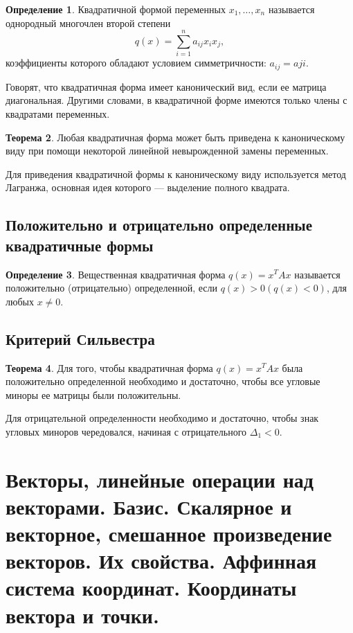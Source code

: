 \documentclass[12pt]{report}
\theoremstyle{definition}
\newtheorem{theorem}{Теорема}[chapter]
\newtheorem{definition}[theorem]{Определение}
\begin{document}
\begin{definition}
Квадратичной формой переменных $x_1, \dots, x_n$ называется однородный
многочлен второй степени
$$
q(x) = \sum\limits_{i=1}^n a_{ij} x_i x_j,
$$
коэффициенты которого обладают условием симметричности: $a_{ij} = a{ji}$.
\end{definition}

Говорят, что квадратичная форма имеет канонический вид, если ее матрица диагональная.
Другими словами, в квадратичной форме имеются только члены с квадратами переменных.

\begin{theorem}
Любая квадратичная форма может быть приведена к каноническому виду
при помощи некоторой линейной невырожденной замены переменных.
\end{theorem}

Для приведения квадратичной формы к каноническому виду используется
метод Лагранжа, основная идея которого --- выделение полного квадрата.

\subsection{Положительно и отрицательно определенные квадратичные формы}
\begin{definition}
Вещественная квадратичная форма $q(x) = x^T A x$ называется положительно (отрицательно)
определенной, если $q(x) > 0 (q(x) < 0)$, для любых $x \ne 0$.
\end{definition}

\subsection{Критерий Сильвестра}
\begin{theorem}
Для того, чтобы квадратичная форма $q(x) = x^T A x$ была положительно
определенной необходимо и достаточно, чтобы все угловые миноры ее матрицы
были положительны.
\end{theorem}

Для отрицательной определенности необходимо и достаточно, чтобы 
знак угловых миноров чередовался, начиная с отрицательного $\Delta_1 < 0$.


\section
{
  Векторы, линейные операции над векторами.
  Базис. Скалярное и векторное, смешанное произведение векторов.
  Их свойства. Аффинная система координат. Координаты вектора и точки.
}
\end{document}
